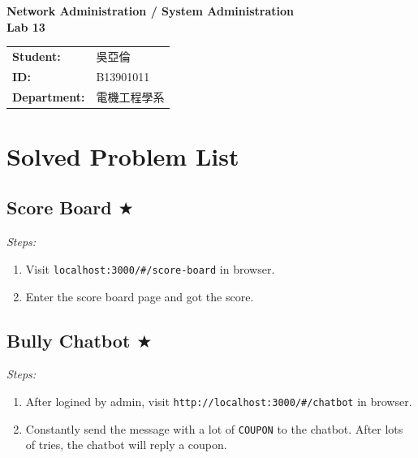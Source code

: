\documentclass[12pt]{article}
\begin{document}
\thispagestyle{fancy}


\begin{center}
  {\large \bfseries Network Administration / System Administration} \\
  \vspace{1em}
  {\Large \bfseries Lab 13} \\
\end{center}

\vspace{2em}

\begin{tabular}{@{}l l}
  \textbf{Student:} & 吳亞倫 \\
  \textbf{ID:} & B13901011  \\
  \textbf{Department:} & 電機工程學系
\end{tabular}
\bigskip

\section{Solved Problem List}

\subsection*{Score Board $\bigstar$}
\textit{Steps:}
\begin{enumerate}
  \item Visit \texttt{localhost:3000/\#/score-board} in browser.
  \item Enter the score board page and got the score.
\end{enumerate}

\subsection*{Bully Chatbot $\bigstar$}
\textit{Steps:}
\begin{enumerate}
  \item After logined by admin, visit \texttt{http://localhost:3000/\#/chatbot} in browser.
  \item Constantly send the message with a lot of \texttt{COUPON} to the chatbot. After lots of tries, the chatbot will reply a coupon.
\end{enumerate}
\end{document}
